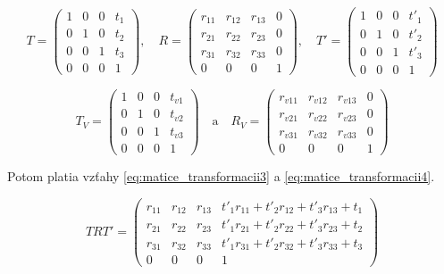 \begin{equation}
    T =
    \begin{pmatrix}
    1 & 0 & 0 & t_1 \\
    0 & 1 & 0 & t_2 \\
    0 & 0 & 1 & t_3 \\
    0 & 0 & 0 & 1
    \end{pmatrix}
    \mathrm{,} \quad 
    R =
    \begin{pmatrix}
    r_{11} & r_{12} & r_{13} & 0 \\
    r_{21} & r_{22} & r_{23} & 0 \\
    r_{31} & r_{32} & r_{33} & 0 \\
    0 & 0 & 0 & 1
    \end{pmatrix}
    \mathrm{,} \quad 
    T' =
    \begin{pmatrix}
    1 & 0 & 0 & t'_1 \\
    0 & 1 & 0 & t'_2 \\
    0 & 0 & 1 & t'_3 \\
    0 & 0 & 0 & 1
    \end{pmatrix}
\label{eq:matice_transformacii1}
\end{equation}

\begin{equation}
    T_V =
    \begin{pmatrix}
    1 & 0 & 0 & t_{v1} \\
    0 & 1 & 0 & t_{v2} \\
    0 & 0 & 1 & t_{v3} \\
    0 & 0 & 0 & 1
    \end{pmatrix}
    \quad \mathrm{a} \quad 
    R_V =
    \begin{pmatrix}
    r_{v11} & r_{v12} & r_{v13} & 0 \\
    r_{v21} & r_{v22} & r_{v23} & 0 \\
    r_{v31} & r_{v32} & r_{v33} & 0 \\
    0 & 0 & 0 & 1
    \end{pmatrix}
\label{eq:matice_transformacii2}
\end{equation}

Potom platia vzťahy \ref{eq:matice_transformacii3} a \ref{eq:matice_transformacii4}.

\begin{equation}
    T R T' =
    \begin{pmatrix}
    r_{11} & r_{12} & r_{13} & t'_1 r_{11} + t'_2 r_{12} + t'_3 r_{13} + t_1 \\
    r_{21} & r_{22} & r_{23} &  t'_1 r_{21} + t'_2 r_{22} + t'_3 r_{23} + t_2 \\
    r_{31} & r_{32} & r_{33} &  t'_1 r_{31} + t'_2 r_{32} + t'_3 r_{33} + t_3 \\
    0 & 0 & 0 & 1
    \end{pmatrix}
\label{eq:matice_transformacii3}
\end{equation}

